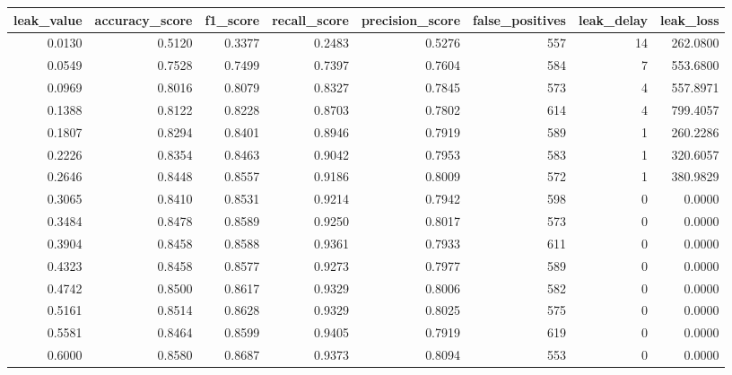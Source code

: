 \begin{tabular}{rrrrrrrr}
\toprule
leak\_value & accuracy\_score & f1\_score & recall\_score & precision\_score & false\_positives & leak\_delay & leak\_loss \\
\midrule
0.0130 & 0.5120 & 0.3377 & 0.2483 & 0.5276 & 557 & 14 & 262.0800 \\
0.0549 & 0.7528 & 0.7499 & 0.7397 & 0.7604 & 584 & 7 & 553.6800 \\
0.0969 & 0.8016 & 0.8079 & 0.8327 & 0.7845 & 573 & 4 & 557.8971 \\
0.1388 & 0.8122 & 0.8228 & 0.8703 & 0.7802 & 614 & 4 & 799.4057 \\
0.1807 & 0.8294 & 0.8401 & 0.8946 & 0.7919 & 589 & 1 & 260.2286 \\
0.2226 & 0.8354 & 0.8463 & 0.9042 & 0.7953 & 583 & 1 & 320.6057 \\
0.2646 & 0.8448 & 0.8557 & 0.9186 & 0.8009 & 572 & 1 & 380.9829 \\
0.3065 & 0.8410 & 0.8531 & 0.9214 & 0.7942 & 598 & 0 & 0.0000 \\
0.3484 & 0.8478 & 0.8589 & 0.9250 & 0.8017 & 573 & 0 & 0.0000 \\
0.3904 & 0.8458 & 0.8588 & 0.9361 & 0.7933 & 611 & 0 & 0.0000 \\
0.4323 & 0.8458 & 0.8577 & 0.9273 & 0.7977 & 589 & 0 & 0.0000 \\
0.4742 & 0.8500 & 0.8617 & 0.9329 & 0.8006 & 582 & 0 & 0.0000 \\
0.5161 & 0.8514 & 0.8628 & 0.9329 & 0.8025 & 575 & 0 & 0.0000 \\
0.5581 & 0.8464 & 0.8599 & 0.9405 & 0.7919 & 619 & 0 & 0.0000 \\
0.6000 & 0.8580 & 0.8687 & 0.9373 & 0.8094 & 553 & 0 & 0.0000 \\
\bottomrule
\end{tabular}
